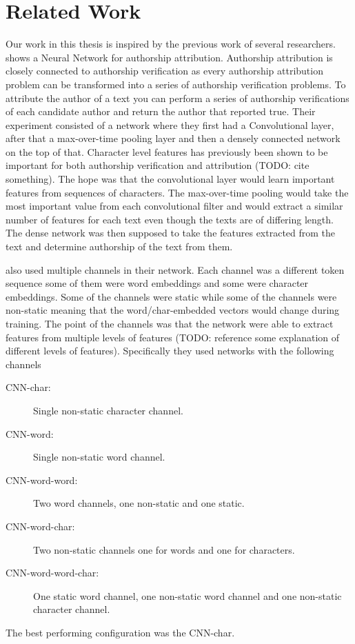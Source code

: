 \section{Related Work} \label{sec:related_work}

Our work in this thesis is inspired by the previous work of several researchers.
\cite{DBLP:journals/corr/RuderGB16c} shows a Neural Network for authorship
attribution. Authorship attribution is closely connected to authorship
verification as every authorship attribution problem can be transformed into a
series of authorship verification problems. To attribute the author of a text
you can perform a series of authorship verifications of each candidate author
and return the author that reported true. Their experiment consisted of a
network where they first had a Convolutional layer, after that a max-over-time
pooling layer and then a densely connected network on the top of that. Character
level features has previously been shown to be important for both authorship
verification and attribution (TODO: cite something). The hope was that the
convolutional layer would learn important features from sequences of characters.
The max-over-time pooling would take the most important value from each
convolutional filter and would extract a similar number of features for each
text even though the texts are of differing length. The dense network was then
supposed to take the features extracted from the text and determine authorship
of the text from them.

\cite{DBLP:journals/corr/RuderGB16c} also used multiple channels in their
network. Each channel was a different token sequence some of them were word
embeddings and some were character embeddings. Some of the channels were static
while some of the channels were non-static meaning that the word/char-embedded
vectors would change during training. The point of the channels was that the
network were able to extract features from multiple levels of features (TODO:
reference some explanation of different levels of features). Specifically they
used networks with the following channels

\begin{description}
    \item[CNN-char:] Single non-static character channel.
    \item[CNN-word:] Single non-static word channel.
    \item[CNN-word-word:] Two word channels, one non-static and one static.
    \item[CNN-word-char:] Two non-static channels one for words and one for
        characters.
    \item[CNN-word-word-char:] One static word channel, one non-static word
        channel and one non-static character channel.
\end{description}

The best performing configuration was the CNN-char.
